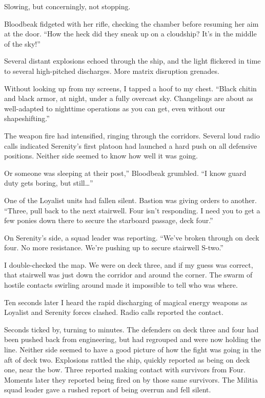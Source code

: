 Slowing, but concerningly, not stopping.

Bloodbeak fidgeted with her rifle, checking the chamber before resuming her aim at the door. “How the heck did they sneak up on a cloudship? It’s in the middle of the sky!”

Several distant explosions echoed through the ship, and the light flickered in time to several high-pitched discharges. More matrix disruption grenades.

Without looking up from my screens, I tapped a hoof to my chest. “Black chitin and black armor, at night, under a fully overcast sky. Changelings are about as well-adapted to nighttime operations as you can get, even without our shapeshifting.”

The weapon fire had intensified, ringing through the corridors. Several loud radio calls indicated Serenity’s first platoon had launched a hard push on all defensive positions. Neither side seemed to know how well it was going.

\leavevmode{}Or someone was sleeping at their post,” Bloodbeak grumbled. “I know guard duty gets boring, but still…”

One of the Loyalist units had fallen silent. Bastion was giving orders to another. “Three, pull back to the next stairwell. Four isn’t responding. I need you to get a few ponies down there to secure the starboard passage, deck four.”

On Serenity’s side, a squad leader was reporting. “We’ve broken through on deck four. No more resistance. We’re pushing up to secure stairwell S-two.”

I double-checked the map. We were on deck three, and if my guess was correct, that stairwell was just down the corridor and around the corner. The swarm of hostile contacts swirling around made it impossible to tell who was where.

Ten seconds later I heard the rapid discharging of magical energy weapons as Loyalist and Serenity forces clashed. Radio calls reported the contact.

Seconds ticked by, turning to minutes. The defenders on deck three and four had been pushed back from engineering, but had regrouped and were now holding the line. Neither side seemed to have a good picture of how the fight was going in the aft of deck two. Explosions rattled the ship, quickly reported as being on deck one, near the bow. Three reported making contact with survivors from Four. Moments later they reported being fired on by those same survivors. The Militia squad leader gave a rushed report of being overrun and fell silent.

